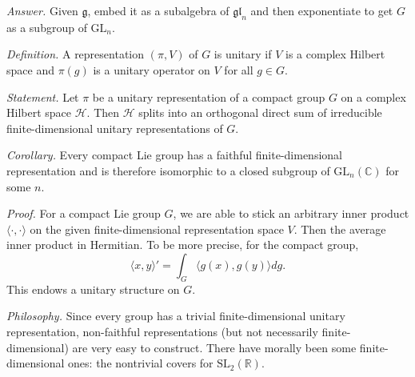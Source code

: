 \documentclass{mathproblems}
\newcommand\R{\mathbb{R}}
\newcommand\C{\mathbb{C}}
\newcommand\GL{\mathrm{GL}}
\newcommand\SL{\mathrm{SL}}
\begin{document}
\begin{questions}
\textit{Answer.} Given $\mathfrak{g}$, embed it as a subalgebra of $\mathfrak{gl}_n$ and then exponentiate to get $G$ as a subgroup of $\GL_n$.


\textit{Definition.} A representation $(\pi,V)$ of $G$ is unitary if $V$ is a complex Hilbert space and $\pi(g)$ is a unitary operator on $V$ for all $g\in G$.

\textit{Statement.} Let $\pi$ be a unitary representation of a compact group $G$ on a complex Hilbert space $\mathcal{H}$. Then $\mathcal{H}$ splits into an orthogonal direct sum of irreducible finite-dimensional unitary representations of $G$.

\textit{Corollary.} Every compact Lie group has a faithful finite-dimensional representation and is therefore isomorphic to a closed subgroup of $\GL_n(\C)$ for some $n$.




\textit{Proof.} For a compact Lie group $G$, we are able to stick an arbitrary inner product $\langle \cdot,\cdot\rangle$ on the given finite-dimensional representation space $V$. Then the average inner product in Hermitian. To be more precise, for the compact group,
$$
\langle x,y\rangle'=\int_{G} \langle g(x),g(y)\rangle d g.
$$
This endows a unitary structure on $G$.


\textit{Philosophy.} Since every group has a trivial finite-dimensional unitary representation, non-faithful representations (but not necessarily finite-dimensional) are very easy to construct. There have morally been some finite-dimensional ones: the nontrivial covers for $\SL_2(\R)$.


\end{questions}
\end{document}
